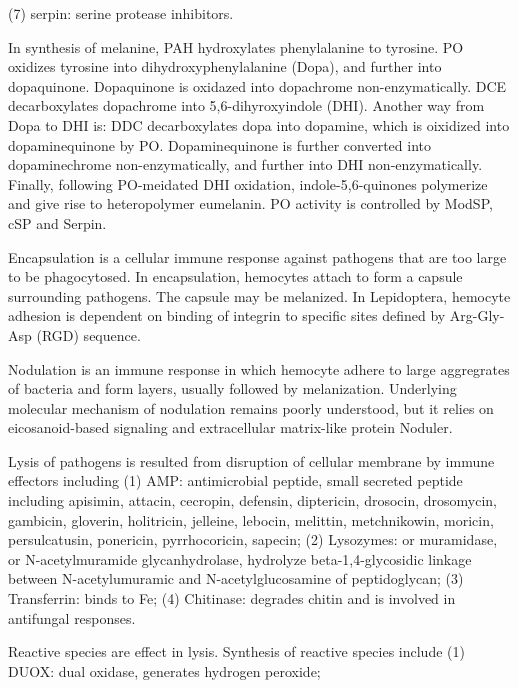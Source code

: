 \documentclass[11pt]{article}
\begin{document}
\begin{sloppypar}
(7) serpin: serine protease inhibitors. 
\par
In synthesis of melanine, PAH hydroxylates phenylalanine to tyrosine. 
PO oxidizes tyrosine into dihydroxyphenylalanine (Dopa), and further into dopaquinone. 
Dopaquinone is oxidazed into dopachrome non-enzymatically. 
DCE decarboxylates dopachrome into 5,6-dihyroxyindole (DHI). 
Another way from Dopa to DHI is: 
DDC decarboxylates dopa into dopamine, which is oixidized into dopaminequinone by PO. 
Dopaminequinone is further converted into dopaminechrome non-enzymatically, and further into DHI non-enzymatically. 
Finally, following PO-meidated DHI oxidation, indole-5,6-quinones polymerize and give rise to heteropolymer eumelanin. 
PO activity is controlled by ModSP, cSP and Serpin.
\par
Encapsulation is a cellular immune response against pathogens that are too large to be phagocytosed. 
In encapsulation, hemocytes attach to form a capsule surrounding pathogens. 
The capsule may be melanized. 
In Lepidoptera, hemocyte adhesion is dependent on binding of integrin to specific sites defined by Arg-Gly-Asp (RGD) sequence. 
\par
Nodulation is an immune response in which hemocyte adhere to large aggregrates of bacteria and form layers, usually followed by melanization. 
Underlying molecular mechanism of nodulation remains poorly understood, but it relies on eicosanoid-based signaling and extracellular matrix-like protein Noduler. 
\par
Lysis of pathogens is resulted from disruption of cellular membrane by immune effectors including 
\newline
(1) AMP: antimicrobial peptide, small secreted peptide including apisimin, attacin, cecropin, defensin, diptericin, drosocin, drosomycin, gambicin, gloverin, holitricin, jelleine, lebocin, melittin, metchnikowin, moricin, persulcatusin, ponericin, pyrrhocoricin, sapecin; \newline
(2) Lysozymes: or muramidase, or N-acetylmuramide glycanhydrolase, hydrolyze beta-1,4-glycosidic linkage between N-acetylumuramic and N-acetylglucosamine of peptidoglycan; \newline
(3) Transferrin: binds to Fe; \newline
(4) Chitinase: degrades chitin and is involved in antifungal responses.
\par
Reactive species are effect in lysis. 
Synthesis of reactive species include 
\newline
(1) DUOX: dual oxidase, generates hydrogen peroxide; \newline

\end{sloppypar}
\end{document}
